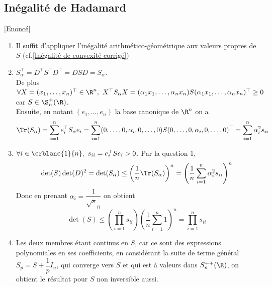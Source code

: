 \documentclass[8pt]{book}
\begin{document}
	\subsection{Inégalité de Hadamard}
	\label{Inégalité de Hadamard corrigé}
	\textcolor{blue}{\hyperref[Inégalité de Hadamard]{[Enoncé]}}\\
	\begin{enumerate}[leftmargin=*]
		\item Il suffit d'appliquer l'inégalité arithmético-géométrique aux valeurs propres de $S$ (cf.\ref{Inégalité de convexité corrigé})
		\item $S_\alpha^\top=D^\top S^\top D^\top=DSD=S_\alpha$.\\
		De plus $\forall X=(x_1,\dots,x_n)^\top\in \R^n,\ X^\top S_\alpha X=(\alpha_1x_1,\dots,\alpha_nx_n)S(\alpha_1x_1,\dots,\alpha_nx_n)^\top\geq 0$ car $S\in \S_n^+(\R)$.\\
		Ensuite, en notant $(e_1,\dots,e_n)$ la base canonique de $\R^n$ on a $$\Tr(S_\alpha)=\displaystyle\sum_{i=1}^ne_i^\top S_\alpha e_i=\sum_{i=1}^n(0,\dots,0,\alpha_i,0,\dots,0)S(0,\dots,0,\alpha_i,0,\dots,0)^\top=\sum_{i=1}^n\alpha_i^2s_{ii}$$
		\item $\forall i\in \crblanc{1}{n},\ s_{ii}=e_i^\top Se_i>0$. Par la question 1,\\
		$$\det(S)\det(D)^2=\det(S_\alpha)\leq \left(\frac{1}{n}\Tr(S_\alpha)\right)^n=\left(\frac{1}{n}\sum_{i=1}^n\alpha_i^2s_{ii}\right)^n$$
		Donc en prenant $\alpha_i=\dfrac{1}{\sqrt s_{ii}}$ on obtient
		$$\det(S)\leq \left(\prod_{i=1}^ns_{ii}\right)\left(\frac{1}{n}\sum_{i=1}^n1\right)^n=\prod_{i=1}^ns_{ii}$$
		\item Les deux membres étant continus en $S$, car ce sont des expressions polynomiales en ses coefficients, en considérant la suite de terme général $S_p=S+\dfrac{1}{p}I_n$, qui converge vers $S$ et qui est à valeurs dans $S_n^{++}(\R)$, on obtient le résultat pour $S$ non inversible aussi.
	\end{enumerate}
	
\end{document}
